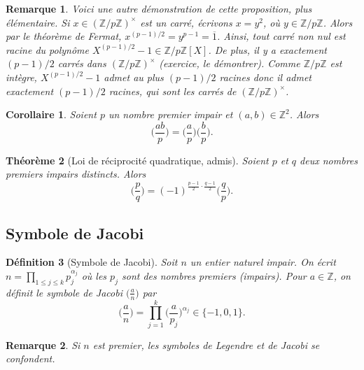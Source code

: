 \documentclass[12pt]{report}
\newtheorem{thm}{Théorème}[chapter]
\newtheorem*{rem}{Remarque}
\newtheorem{Def}[thm]{Définition}
\newtheorem{Cor}[thm]{Corollaire}
\newcommand{\Z}{\mathbb{Z}}
\begin{document}
\begin{rem}
Voici une autre démonstration de cette proposition, plus élémentaire. Si $x\in (\Z/p\Z)^\times$ est un carré, écrivons $x=y^2$, où $y\in \Z/p\Z$. Alors par le théorème de Fermat, $x^{(p-1)/2}=y^{p-1}=\overline{1}$. Ainsi, tout carré non nul est racine du polynôme $X^{(p-1)/2}-1\in \Z/p\Z[X]$. De plus, il y a exactement $(p-1)/2$ carrés dans $(\Z/p\Z)^\times$ (exercice, le démontrer). Comme $\Z/p\Z$ est intègre, $X^{(p-1)/2}-1$ admet au plus $(p-1)/2$ racines donc il admet exactement $(p-1)/2$ racines, qui sont les carrés de $(\Z/p\Z)^\times$.
\end{rem}

\begin{Cor}
Soient $p$ un nombre premier impair et $(a,b) \in \mathbb{Z}^2$. Alors 
$$  \Big( \frac{ab}{p} \Big)=  \Big( \frac{a}{p} \Big)\Big(  \frac{b}{p}\Big)  .  $$
\end{Cor}

\begin{thm}[Loi de réciprocité quadratique, admis] Soient $p$ et $q$ deux nombres premiers impairs distincts. Alors
$$    \Big(  \frac{p}{q}\Big)=(-1)^{\tfrac{p-1}{2}\cdot \tfrac{q-1}{2}}\Big(  \frac{q}{p}\Big).   $$
\end{thm}


\subsection{Symbole de Jacobi}

\begin{Def}[Symbole de Jacobi]
Soit $n$ un entier naturel impair. On écrit $n=\prod_{1 \leq j \leq k}p_j^{\alpha_j}$ où les $p_j$ sont des nombres premiers (impairs). Pour $a \in \mathbb{Z}$, on définit le symbole de Jacobi $\big(  \tfrac{a}{n}\big)$ par
$$ \Big(  \frac{a}{n}\Big) =\prod_{j=1}^k \Big(  \frac{a}{p_j}\Big)^{\alpha_j} \in \{-1,0,1\} .  $$
\end{Def}

\begin{rem}
Si $n$ est premier, les symboles de Legendre et de Jacobi se confondent.
\end{rem}
\end{document}
